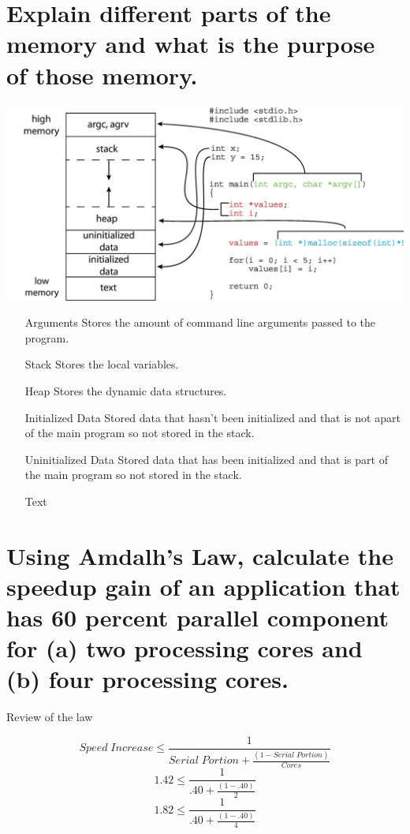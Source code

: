 \documentclass{article}
\begin{document}
\section{Explain different parts of the memory and what is the purpose of those memory.}
\includegraphics{program_memory}
\begin{itemize}
	\item [Arguments] Stores the amount of command line arguments passed to the program. 
	\item [Stack] Stores the local variables.
	\item [Heap] Stores the dynamic data structures. 
	\item [Initialized Data] Stored data that hasn't been initialized and that is not apart of the main program so not stored in the stack. 
	\item [Uninitialized Data] Stored data that has been initialized and that is part of the main program so not stored in the stack. 
	\item [Text]
\end{itemize}
\pagebreak
\section{Using Amdalh’s Law, calculate the speedup gain of an application that has 60 percent parallel component for (a) two processing cores and (b) four processing cores.}
\begin{center}
Review of the law
\end{center}
\[Speed\;Increase \le \frac{1}{Serial\;Portion+\frac{(1-Serial\;Portion)}{Cores}}\]
\[1.42 \le \frac{1}{.40+\frac{(1-.40)}{2}}\]
\[1.82 \le \frac{1}{.40+\frac{(1-.40)}{4}}\]
\end{document}

